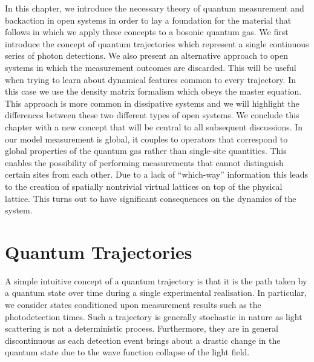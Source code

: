 In this chapter, we introduce the necessary theory of quantum
measurement and backaction in open systems in order to lay a
foundation for the material that follows in which we apply these
concepts to a bosonic quantum gas. We first introduce the concept of
quantum trajectories which represent a single continuous series of
photon detections. We also present an alternative approach to open
systems in which the measurement outcomes are discarded. This will be
useful when trying to learn about dynamical features common to every
trajectory. In this case we use the density matrix formalism which
obeys the master equation. This approach is more common in dissipative
systems and we will highlight the differences between these two
different types of open systems. We conclude this chapter with a new
concept that will be central to all subsequent discussions. In our
model measurement is global, it couples to operators that correspond
to global properties of the quantum gas rather than single-site
quantities. This enables the possibility of performing measurements
that cannot distinguish certain sites from each other. Due to a lack
of ``which-way'' information this leads to the creation of spatially
nontrivial virtual lattices on top of the physical lattice. This turns
out to have significant consequences on the dynamics of the system.

\section{Quantum Trajectories}

A simple intuitive concept of a quantum trajectory is that it is the
path taken by a quantum state over time during a single experimental
realisation. In particular, we consider states conditioned upon
measurement results such as the photodetection times. Such a
trajectory is generally stochastic in nature as light scattering is
not a deterministic process. Furthermore, they are in general
discontinuous as each detection event brings about a drastic change in
the quantum state due to the wave function collapse of the light field.

